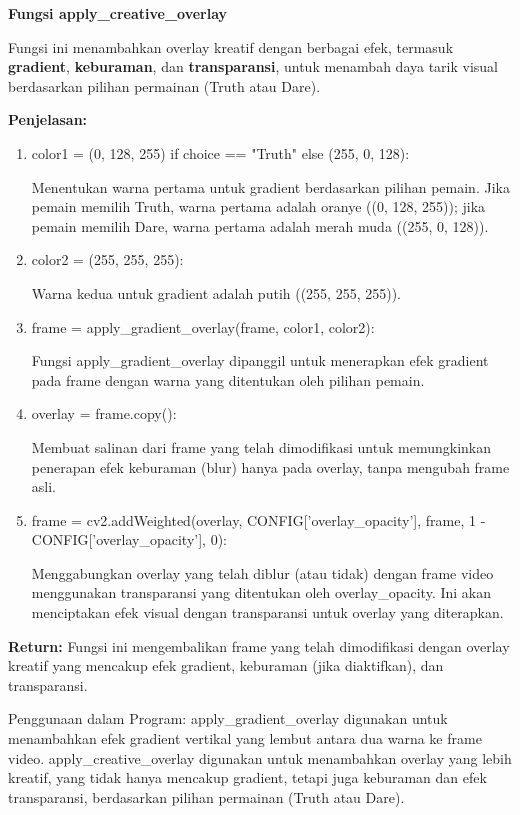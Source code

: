 \documentclass[11pt,a4paper]{article}
\begin{document}
\textbf{Fungsi apply\_creative\_overlay  }

Fungsi ini menambahkan overlay kreatif dengan berbagai efek, termasuk \textbf{gradient}, \textbf{keburaman}, dan \textbf{transparansi}, untuk menambah daya tarik visual berdasarkan pilihan permainan (Truth atau Dare).

\textbf{Penjelasan:}
\begin{enumerate}
    \item color1 = (0, 128, 255) if choice == "Truth" else (255, 0, 128): 
    
    Menentukan warna pertama untuk gradient berdasarkan pilihan pemain. Jika pemain memilih Truth, warna pertama adalah oranye ((0, 128, 255)); jika pemain memilih Dare, warna pertama adalah merah muda ((255, 0, 128)).
    \item color2 = (255, 255, 255): 

    Warna kedua untuk gradient adalah putih ((255, 255, 255)).
    \item frame = apply\_gradient\_overlay(frame, color1, color2):  
    
    Fungsi apply\_gradient\_overlay dipanggil untuk menerapkan efek gradient pada frame dengan warna yang ditentukan oleh pilihan pemain.
    \item overlay = frame.copy():  
    
    Membuat salinan dari frame yang telah dimodifikasi untuk memungkinkan penerapan efek keburaman (blur) hanya pada overlay, tanpa mengubah frame asli.
    \item frame = cv2.addWeighted(overlay, CONFIG['overlay\_opacity'], frame, 1 - CONFIG['overlay\_opacity'], 0):  

    Menggabungkan overlay yang telah diblur (atau tidak) dengan frame video menggunakan transparansi yang ditentukan oleh overlay\_opacity. Ini akan menciptakan efek visual dengan transparansi untuk overlay yang diterapkan.
\end{enumerate}

\textbf{Return:}  
Fungsi ini mengembalikan frame yang telah dimodifikasi dengan overlay kreatif yang mencakup efek gradient, keburaman (jika diaktifkan), dan transparansi.

Penggunaan dalam Program:  
apply\_gradient\_overlay digunakan untuk menambahkan efek gradient vertikal yang lembut antara dua warna ke frame video.  
apply\_creative\_overlay digunakan untuk menambahkan overlay yang lebih kreatif, yang tidak hanya mencakup gradient, tetapi juga keburaman dan efek transparansi, berdasarkan pilihan permainan (Truth atau Dare).
\end{document}

